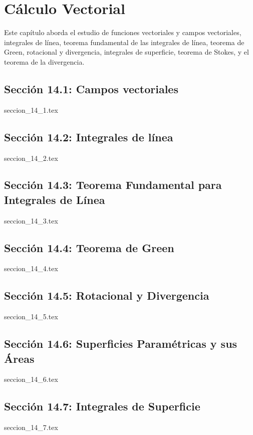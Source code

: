 \chapter{Cálculo Vectorial}
\label{cap:calculo_vectorial}

Este capítulo aborda el estudio de funciones vectoriales y campos vectoriales, integrales de línea, teorema fundamental de las integrales de línea, teorema de Green, rotacional y divergencia, integrales de superficie, teorema de Stokes, y el teorema de la divergencia.

\section*{Sección 14.1: Campos vectoriales}
{seccion_14_1.tex}

\section*{Sección 14.2: Integrales de línea}
{seccion_14_2.tex}

\section*{Sección 14.3: Teorema Fundamental para Integrales de Línea}
{seccion_14_3.tex}

\section*{Sección 14.4: Teorema de Green}
{seccion_14_4.tex}

\section*{Sección 14.5: Rotacional y Divergencia}
{seccion_14_5.tex}

\section*{Sección 14.6: Superficies Paramétricas y sus Áreas}
{seccion_14_6.tex}

\section*{Sección 14.7: Integrales de Superficie}
{seccion_14_7.tex}


